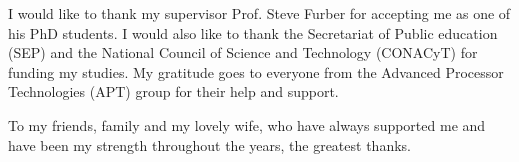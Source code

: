I would like to thank my supervisor Prof. Steve Furber for accepting me as one of his PhD students. 
I would also like to thank the Secretariat of Public education (SEP) and the National Council of Science and Technology (CONACyT) for funding my studies. 
My gratitude goes to everyone from the Advanced Processor Technologies (APT) group for their help and support.

To my friends, family and my lovely wife, who have always supported me and have been my strength throughout the years, the greatest thanks. 
